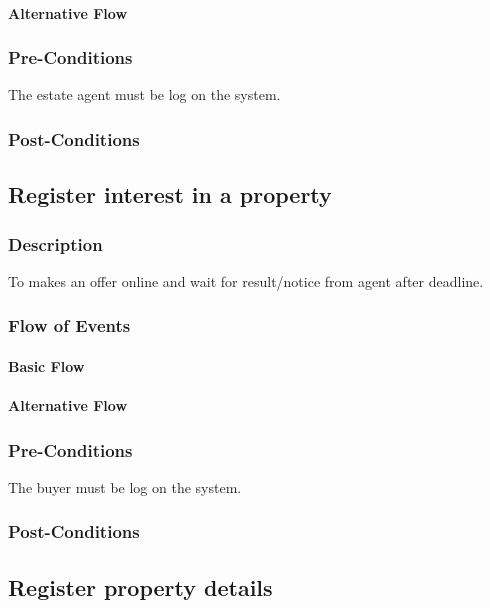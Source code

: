 \documentclass[a4paper,12pt]{article}
\begin{document}
\paragraph{Alternative Flow}
\begin{itemize}
\end{itemize}
\subsubsection{Pre-Conditions}
The estate agent must be log on the system.
\subsubsection{Post-Conditions}

\subsection{Register interest in a property}
\subsubsection{Description}
To makes an offer online and wait for result/notice from agent after deadline.
\subsubsection{Flow of Events}
\paragraph{Basic Flow}
\begin{itemize}
\end{itemize}
\paragraph{Alternative Flow}
\begin{itemize}
\end{itemize}
\subsubsection{Pre-Conditions}
The buyer must be log on the system.
\subsubsection{Post-Conditions}

\subsection{Register property details}
\end{document}
